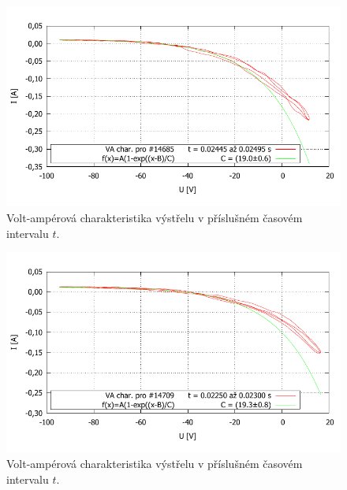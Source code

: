 \documentclass[english]{article}
\begin{document}
	\begin{figure}[h!]
	\begin{center}
	    \vspace*{-1cm}
		\includegraphics[width=\linewidth]{../gnuplot/VA_merge_14685.pdf}
	    \vspace*{-1,5cm}
		\caption{Volt-ampérová charakteristika výstřelu v příslušném časovém intervalu $t$. } 
		\label{fig:g_VA3}
	\end{center}
	\end{figure}	
%
	\begin{figure}[h!]
	\begin{center}
	    \vspace*{-1cm}
		\includegraphics[width=\linewidth]{../gnuplot/VA_merge_14709.pdf}
	    \vspace*{-1,5cm}
		\caption{Volt-ampérová charakteristika výstřelu v příslušném časovém intervalu $t$. } 
		\label{fig:g_VA4}
	\end{center}
	\end{figure}	
%
\end{document}
